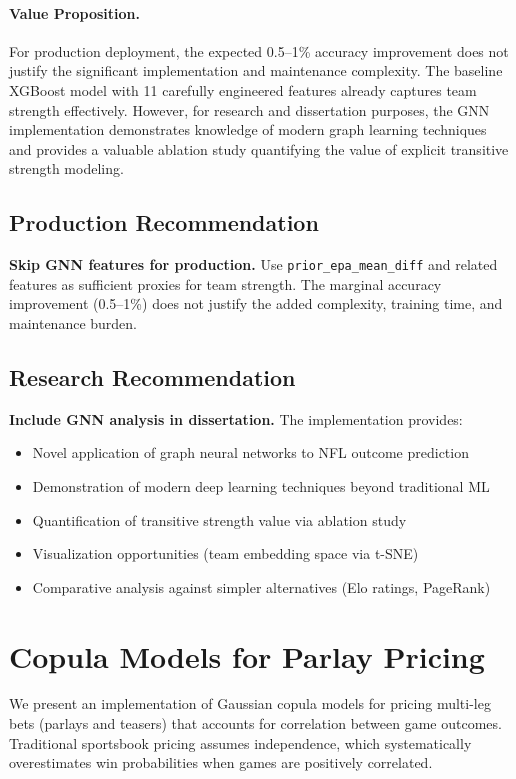 \paragraph{Value Proposition.}
For production deployment, the expected 0.5--1\% accuracy improvement does not justify the significant implementation and maintenance complexity. The baseline XGBoost model with 11 carefully engineered features already captures team strength effectively. However, for research and dissertation purposes, the GNN implementation demonstrates knowledge of modern graph learning techniques and provides a valuable ablation study quantifying the value of explicit transitive strength modeling.

\subsection{Production Recommendation}
\textbf{Skip GNN features for production.} Use \texttt{prior\_epa\_mean\_diff} and related features as sufficient proxies for team strength. The marginal accuracy improvement (0.5--1\%) does not justify the added complexity, training time, and maintenance burden.

\subsection{Research Recommendation}
\textbf{Include GNN analysis in dissertation.} The implementation provides:
\begin{itemize}
  \item Novel application of graph neural networks to NFL outcome prediction
  \item Demonstration of modern deep learning techniques beyond traditional ML
  \item Quantification of transitive strength value via ablation study
  \item Visualization opportunities (team embedding space via t-SNE)
  \item Comparative analysis against simpler alternatives (Elo ratings, PageRank)
\end{itemize}

\section{Copula Models for Parlay Pricing}\label{app:copula}
We present an implementation of Gaussian copula models for pricing multi-leg bets (parlays and teasers) that accounts for correlation between game outcomes. Traditional sportsbook pricing assumes independence, which systematically overestimates win probabilities when games are positively correlated.

